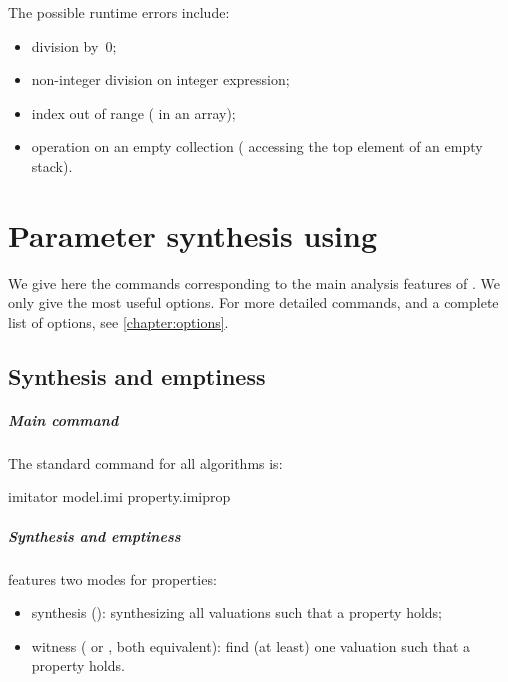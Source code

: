 The possible runtime errors include:
\begin{itemize}
	\item division by~0;
	\item non-integer division on integer expression;
	\item index out of range (\eg{} in an array);
	\item operation on an empty collection (\eg{} accessing the top element of an empty stack).
\end{itemize}


\chapter{Parameter synthesis using \imitator{}}


We give here the commands corresponding to the main analysis features of \imitator{}.
We only give the most useful options.
For more detailed commands, and a complete list of options, see \cref{chapter:options}.

\section{Synthesis and emptiness}

\paragraph{Main command}
The standard \imitator{} command for all algorithms is:

\begin{terminal}
imitator model.imi property.imiprop
\end{terminal}

\paragraph{Synthesis and emptiness}
\imitator{} features two modes for properties:

\begin{itemize}
	\item synthesis (): synthesizing all valuations such that a property holds;
	\item witness ( or , both equivalent): find (at least) one valuation such that a property holds.
\end{itemize}

